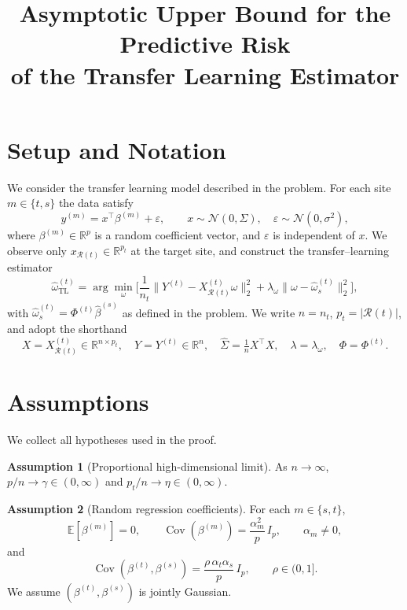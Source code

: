 \documentclass[11pt,a4paper]{article}
\title{Asymptotic Upper Bound for the Predictive Risk\\
of the Transfer Learning Estimator}
\author{}
\date{}
\theoremstyle{definition}
\newtheorem{assumption}{Assumption}[section]
\DeclareMathOperator{\Cov}{Cov}
\newcommand{\R}{\mathbb{R}}
\newcommand{\E}{\mathbb{E}}
\newcommand{\N}{\mathcal{N}}
\newcommand{\cR}{\mathcal{R}}
\newcommand{\ohat}{\hat{\omega}_{\mathrm{TL}}^{(t)}}
\newcommand{\bhat}{\hat{\beta}^{(s)}}
\begin{document}
\maketitle

\section{Setup and Notation}\label{sec:setup}

We consider the transfer learning model described in the problem.
For each site $m\in\{t,s\}$ the data satisfy
\[
  y^{(m)} = x^\top\beta^{(m)}+\varepsilon, \qquad
  x\sim\N(0,\Sigma),\quad
  \varepsilon\sim\N(0,\sigma^{2}),
\]
where $\beta^{(m)}\in\R^{p}$ is a random coefficient vector, and
$\varepsilon$ is independent of $x$.  We observe only
$x_{\cR(t)}\in\R^{p_t}$ at the target site, and construct the
transfer--learning estimator
\[
  \ohat
  =\arg\min_{\omega}\biggl[
  \frac{1}{n_t}\|Y^{(t)}-X_{\cR(t)}^{(t)}\omega\|_{2}^{2}
  +\lambda_\omega\|\omega-\hat\omega_{s}^{(t)}\|_{2}^{2}\biggr],
\]
with $\hat\omega_{s}^{(t)}=\Phi^{(t)}\bhat$ as defined in the
problem.  We write $n=n_t$, $p_t=|\cR(t)|$, and adopt the shorthand
\[
  X=X_{\cR(t)}^{(t)}\in\R^{n\times p_t},\quad
  Y=Y^{(t)}\in\R^{n},\quad
  \hat\Sigma=\tfrac{1}{n}X^{\top}X,\quad
  \lambda=\lambda_\omega,\quad
  \Phi=\Phi^{(t)}.
\]

\section{Assumptions}\label{sec:assumptions}

We collect all hypotheses used in the proof.

\begin{assumption}[Proportional high-dimensional limit]\label{ass:dim}
As $n\to\infty$, $p/n\to\gamma\in(0,\infty)$ and
$p_t/n\to\eta\in(0,\infty)$.
\end{assumption}

\begin{assumption}[Random regression coefficients]\label{ass:coef}
For each $m\in\{s,t\}$,
\[
  \E[\beta^{(m)}]=0,\qquad
  \Cov(\beta^{(m)})=\frac{\alpha_m^{2}}{p}\,I_p,
  \qquad \alpha_m\neq 0,
\]
and
\[
  \Cov(\beta^{(t)},\beta^{(s)})
  =\frac{\rho\,\alpha_t\alpha_s}{p}\,I_p,
  \qquad \rho\in(0,1].
\]
We assume $(\beta^{(t)},\beta^{(s)})$ is jointly Gaussian.
\end{assumption}
\end{document}

